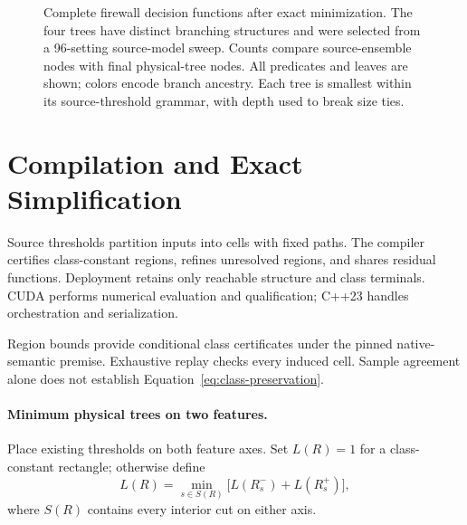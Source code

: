 \begin{figure}[t]
\endgroup

\caption{Complete firewall decision functions after exact minimization. The four trees have distinct branching structures and were selected from a 96-setting source-model sweep. Counts compare source-ensemble nodes with final physical-tree nodes. All predicates and leaves are shown; colors encode branch ancestry. Each tree is smallest within its source-threshold grammar, with depth used to break size ties.}
\label{fig:rules}
\end{figure}
\section{Compilation and Exact Simplification}
Source thresholds partition inputs into cells with fixed paths. The compiler certifies class-constant regions, refines unresolved regions, and shares residual functions. Deployment retains only reachable structure and class terminals. CUDA performs numerical evaluation and qualification; C++23 handles orchestration and serialization.

Region bounds provide conditional class certificates under the pinned native-semantic premise. Exhaustive replay checks every induced cell. Sample agreement alone does not establish Equation~\ref{eq:class-preservation}.

\paragraph{Minimum physical trees on two features.}
Place existing thresholds on both feature axes. Set $L(R)=1$ for a class-constant rectangle; otherwise define
\begin{equation}
L(R)=\min_{s\in S(R)}\bigl[L(R_s^-)+L(R_s^+)\bigr],
\end{equation}
where $S(R)$ contains every interior cut on either axis.

